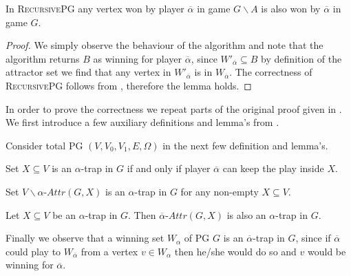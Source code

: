 \begin{lemma}
	\label{lem_overlinealphawinner}
	In \textsc{RecursivePG} any vertex won by player $\overline{\alpha}$ in game $G\backslash A$ is also won by $\overline{\alpha}$ in game $G$.
	\begin{proof}
		We simply observe the behaviour of the algorithm and note that the algorithm returns $B$ as winning for player $\overline{\alpha}$, since $W'_{\overline{\alpha}} \subseteq B$ by definition of the attractor set we find that any vertex in $W'_{\overline{\alpha}}$ is in $W_{\overline{\alpha}}$. The correctness of \textsc{RecursivePG} follows from \cite{ZIELONKA1998135}, therefore the lemma holds.
	\end{proof}
\end{lemma}
In order to prove the correctness we repeat parts of the original proof given in \cite{ZIELONKA1998135}. We first introduce a few auxiliary definitions and lemma's from \cite{ZIELONKA1998135}.

Consider total PG $(V,V_0,V_1,E,\Omega)$ in the next few definition and lemma's.
\begin{definition}\cite{ZIELONKA1998135}
Set $X \subseteq V$ is an $\alpha$-trap in $G$ if and only if player $\overline{\alpha}$ can keep the play inside $X$.
\end{definition}
\begin{lemma}\label{lem_attr_is_trap}
	\cite{ZIELONKA1998135}
	Set $V\backslash \alpha\textit{-Attr}(G,X)$ is an $\alpha$-trap in $G$ for any non-empty $X \subseteq V$.
\end{lemma}
\begin{lemma}
	\label{lem_attr_trap_is_trap}\cite{ZIELONKA1998135}
	Let $X \subseteq V$ be an $\alpha$-trap in $G$. Then $\overline{\alpha}\textit{-Attr}(G,X)$ is also an $\alpha$-trap in $G$.
\end{lemma}
Finally we observe that a winning set $W_\alpha$ of PG $G$ is an $\overline{\alpha}$-trap in $G$, since if $\overline{\alpha}$ could play to $W_{\overline{\alpha}}$ from a vertex $v \in W_\alpha$ then he/she would do so and $v$ would be winning for $\overline{\alpha}$.

